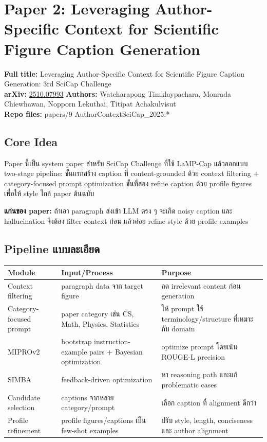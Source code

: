 \documentclass[10pt,a4paper]{article}
\begin{document}
\section{Paper 2: Leveraging Author-Specific Context for Scientific Figure Caption Generation}

\textbf{Full title:} Leveraging Author-Specific Context for Scientific Figure Caption Generation: 3rd SciCap Challenge \\
\textbf{arXiv:} \href{https://arxiv.org/abs/2510.07993}{2510.07993} \quad
\textbf{Authors:} Watcharapong Timklaypachara, Monrada Chiewhawan, Nopporn Lekuthai, Titipat Achakulvisut \\
\textbf{Repo files:} papers/9-AuthorContextSciCap\_2025.*

\subsection{Core Idea}
Paper นี้เป็น system paper สำหรับ SciCap Challenge ที่ใช้ LaMP-Cap แล้วออกแบบ two-stage pipeline: ขั้นแรกสร้าง caption ที่ content-grounded ด้วย context filtering + category-focused prompt optimization ขั้นที่สอง refine caption ด้วย profile figures เพื่อให้ style ใกล้ paper ต้นฉบับ

\begin{note}
\textbf{แก่นของ paper:} ถ้าเอา paragraph ส่งเข้า LLM ตรง ๆ จะเกิด noisy caption และ hallucination จึงต้อง filter context ก่อน แล้วค่อย refine style ด้วย profile examples
\end{note}

\subsection{Pipeline แบบละเอียด}
\begin{longtable}{@{}L{3cm}L{5.7cm}L{5.8cm}@{}}
\toprule
\textbf{Module} & \textbf{Input/Process} & \textbf{Purpose} \\
\midrule
Context filtering & paragraph data จาก target figure & ลด irrelevant content ก่อน generation \\
Category-focused prompt & paper category เช่น CS, Math, Physics, Statistics & ให้ prompt ใช้ terminology/structure ที่เหมาะกับ domain \\
MIPROv2 & bootstrap instruction-example pairs + Bayesian optimization & optimize prompt โดยเน้น ROUGE-L precision \\
SIMBA & feedback-driven optimization & หา reasoning path และแก้ problematic cases \\
Candidate selection & captions จากหลาย category/prompt & เลือก caption ที่ alignment ดีกว่า \\
Profile refinement & profile figures/captions เป็น few-shot examples & ปรับ style, length, conciseness และ author alignment \\
\bottomrule
\end{longtable}
\end{document}
